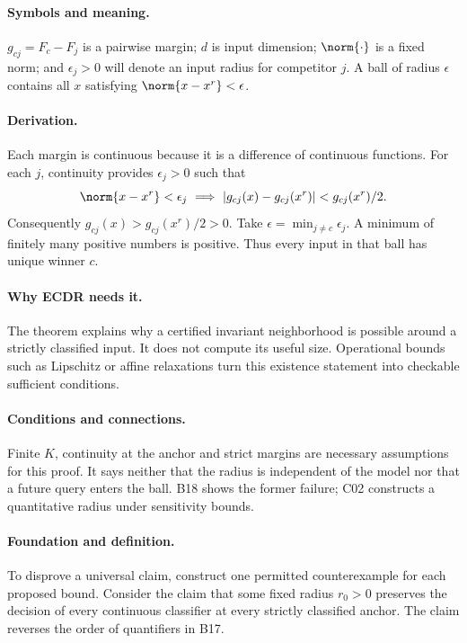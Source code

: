 \paragraph{Symbols and meaning.}
$g_{cj}=F_c-F_j$ is a pairwise margin; $d$ is input dimension;
$\norm{\cdot}$ is a fixed norm; and $\epsilon_j>0$ will denote an
input radius for competitor $j$. A ball of radius $\epsilon$ contains
all $x$ satisfying $\norm{x-x^r}<\epsilon$.
\paragraph{Derivation.}
Each margin is continuous because it is a difference of continuous
functions. For each $j$, continuity provides $\epsilon_j>0$ such that
\[
 \norm{x-x^r}<\epsilon_j
 \ \Longrightarrow\
 |g_{cj}(x)-g_{cj}(x^r)|<g_{cj}(x^r)/2.
\]
Consequently $g_{cj}(x)>g_{cj}(x^r)/2>0$. Take
$\epsilon=\min_{j\ne c}\epsilon_j$. A minimum of finitely many positive
numbers is positive. Thus every input in that ball has unique winner $c$.
\paragraph{Why ECDR needs it.}
The theorem explains why a certified invariant neighborhood is possible
around a strictly classified input. It does not compute its useful size.
Operational bounds such as Lipschitz or affine relaxations turn this
existence statement into checkable sufficient conditions.
\paragraph{Conditions and connections.}
Finite $K$, continuity at the anchor and strict margins are necessary
assumptions for this proof. It says neither that the radius is independent
of the model nor that a future query enters the ball. B18 shows the former
failure; C02 constructs a quantitative radius under sensitivity bounds.

\paragraph{Foundation and definition.}
To disprove a universal claim, construct one permitted counterexample for
each proposed bound. Consider the claim that some fixed radius $r_0>0$
preserves the decision of every continuous classifier at every strictly
classified anchor. The claim reverses the order of quantifiers in B17.

